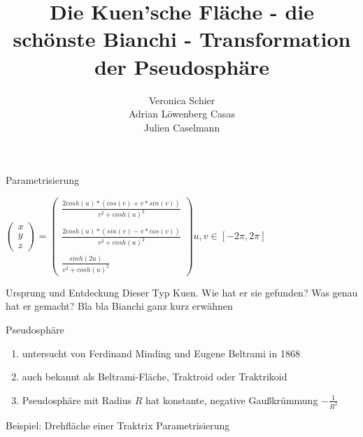 \documentclass[12pt]{beamer}
\author{Veronica Schier \\ Adrian Löwenberg Casas \\ Julien Caselmann}
\title{Die Kuen'sche Fläche - die schönste Bianchi - Transformation der Pseudosphäre}
\begin{document}
\begin{frame}
\titlepage
\end{frame}


\begin{frame}{Parametrisierung}
\begin{center}
$
\begin{pmatrix}
x\\y\\z
\end{pmatrix}
 =
\begin{pmatrix}
\frac{2cosh(u)* \left( cos(v) + v*sin(v) \right)}{v^2+cosh(u)^2}\\\\
\frac{2cosh(u)*(sin(v) - v*cos(v))}{v^2 + cosh(u)^2}\\\\
\frac{sinh(2u)}{v^2 + cosh(u)^2}
\end{pmatrix}
u,v \in \left[ -2\pi , 2\pi \right] $
\end{center}
\end{frame}

\begin{frame}{Ursprung und Entdeckung}
Dieser Typ Kuen. Wie hat er sie gefunden? Was genau hat er gemacht?
Bla bla Bianchi ganz kurz erwähnen
\end{frame}

\begin{frame}{Pseudosphäre}
\begin{enumerate}
\item untersucht von Ferdinand Minding und Eugene Beltrami in 1868
\item auch bekannt als Beltrami-Fläche, Traktroid oder Traktrikoid
\item Pseudosphäre mit Radius $R$ hat konstante, negative Gaußkrümmung $-\frac{1}{R^2}$
\end{enumerate}
\end{frame}

\begin{frame}{Beispiel: Drehfläche einer Traktrix}
Parametrisierung
\end{frame}
\end{document}
